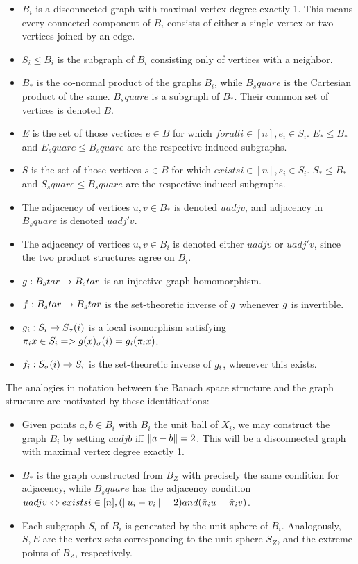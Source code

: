 \documentclass{amsart}
\theoremstyle{definition}
\begin{document}
\begin{itemize}
    \item $B_i$ is a disconnected graph with maximal vertex degree exactly 1. This means every connected component of $B_i$ consists of either a single vertex or two vertices joined by an edge.
    \item $S_i \leq B_i$ is the subgraph of $B_i$ consisting only of vertices with a neighbor.
    \item $B_*$ is the co-normal product of the graphs $B_i$, while $B_square$ is the Cartesian product of the same. $B_square$ is a subgraph of $B_*$. Their common set of vertices is denoted $B$.
    \item $E$ is the set of those vertices $e \in B$ for which $forall i \in [n], e_i \in S_i$. $E_* \leq B_*$ and $E_square \leq B_square$ are the respective induced subgraphs.
    \item $S$ is the set of those vertices $s \in B$ for which $exists i \in [n], s_i \in S_i$. $S_* \leq B_*$ and $S_square \leq B_square$ are the respective induced subgraphs.
    \item The adjacency of vertices $u,v \in B_*$ is denoted $u adj v$, and adjacency in $B_square$ is denoted $u adj' v$.
    \item The adjacency of vertices $u,v \in B_i$ is denoted either $u adj v$ or $u adj' v$, since the two product structures agree on $B_i$.
    \item $g : B_star \to B_star$ is an injective graph homomorphism.
    \item $f : B_star \to B_star$ is the set-theoretic inverse of $g$ whenever $g$ is invertible.
    \item $g_i : S_i \to S_\sigma(i)$ is a local isomorphism satisfying $\pi_i x \in S_i => g(x)_\sigma(i) = g_i (\pi_i x)$.
    \item $f_i : S_\sigma(i) \to S_i$ is the set-theoretic inverse of $g_i$, whenever this exists.
\end{itemize}

The analogies in notation between the Banach space structure and the graph structure are motivated by these identifications:

\begin{itemize}
    \item Given points $a,b \in B_i$ with $B_i$ the unit ball of $X_i$, we may construct the graph $B_i$ by setting $a adj b$ iff $\norm{a-b} = 2$. This will be a disconnected graph with maximal vertex degree exactly 1.
    \item $B_*$ is the graph constructed from $B_Z$ with precisely the same condition for adjacency, while $B_square$ has the adjacency condition $u adj v \Leftrightarrow exists i \in [n], (\norm{u_i - v_i} = 2) and (\hat{\pi}_i u = \hat{\pi}_i v)$.
    \item Each subgraph $S_i$ of $B_i$ is generated by the unit sphere of $B_i$. Analogously, $S,E$ are the vertex sets corresponding to the unit sphere $S_Z$, and the extreme points of $B_Z$, respectively.
\end{itemize}
\end{document}
